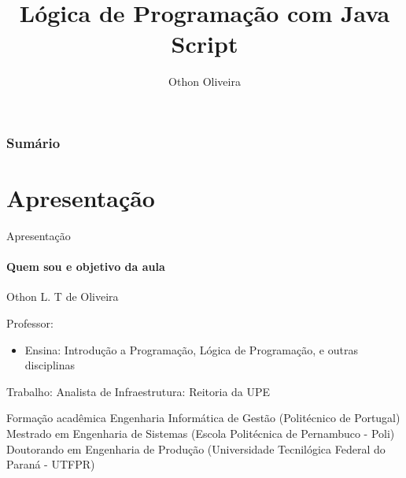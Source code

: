 \documentclass[13pt, xcolor={dvipsnames,svgnames}, portuguese]{beamer}
\author{Othon Oliveira}
\title{Lógica de Programação com Java Script}
\institute{SENAC - PROA}
\date{}
\begin{document}
\begin{frame}
\titlepage
\end{frame}

\newcommand{\capa}{
    \begin{tikzpicture}[remember picture,overlay]
        \node at (current page.south west)
            {\begin{tikzpicture}[remember picture, overlay]
                \fill[shading=radial,top color=orange,bottom color=orange,middle color=yellow] (0,0) rectangle (\paperwidth,\paperheight);
            \end{tikzpicture}
          };
    \end{tikzpicture}
}

\begin{frame}\frametitle{Sumário}
\tableofcontents
\end{frame}

\section{Apresentação}

\begin{frame}{Apresentação}
\framesubtitle{Quem sou  e objetivo da aula}
Othon L. T de Oliveira
	\begin{block}{Professor:}
		\begin{itemize}
		 \pause
		 \item Ensina: Introdução a Programação, Lógica de Programação, e outras disciplinas
		\end{itemize}
	\end{block}	
	\pause
	\begin{block}{Trabalho: }
		 Analista de Infraestrutura: Reitoria da UPE
	\end{block}
	\pause
	\begin{block}{Formação acadêmica}
		Engenharia Informática de Gestão (Politécnico de Portugal)
		\pause
		Mestrado em Engenharia de Sistemas (Escola Politécnica de Pernambuco - Poli)
		\pause
		Doutorando em Engenharia de Produção (Universidade Tecnilógica Federal do Paraná - UTFPR)
	\end{block}	

\end{frame}

\end{document}
